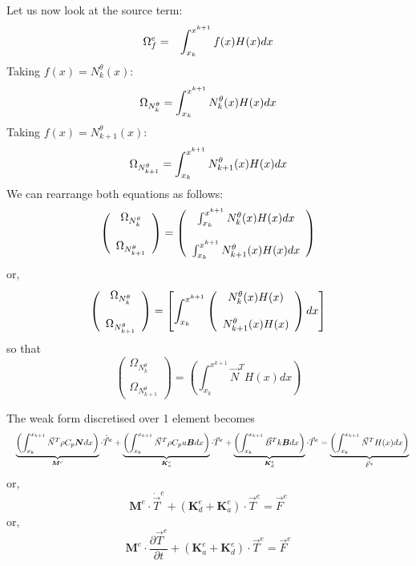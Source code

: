 Let us now look at the source term:
\begin{eqnarray}
{\Omega}_f^e &=&
\int_{x_k}^{x^{k+1}} f(x) H(x) dx \nonumber
\end{eqnarray}
Taking $f(x)=N_k^\theta(x)$: 
\[
{\Omega}_{N_k^\theta}=
\int_{x_k}^{x^{k+1}} N_k^\theta(x) H(x) dx \nonumber
\]
Taking $f(x)=N_{k+1}^\theta(x)$: 
\[
{\Omega}_{N_{k+1}^\theta}=
\int_{x_k}^{x^{k+1}} N_{k+1}^\theta(x) H(x) dx \nonumber
\]
We can rearrange both equations as follows:
\[
\left(
\begin{array}{cc}
 {\Omega}_{N_k^\theta} \\ \\ {\Omega}_{N_{k+1}^\theta}
\end{array}
\right)
=
\left(
\begin{array}{cc}
\int_{x_k}^{x^{k+1}} N_k^\theta(x) H(x) dx \nonumber \\ \\ 
\int_{x_k}^{x^{k+1}} N_{k+1}^\theta(x) H(x) dx \nonumber
\end{array}
\right)
\]
or,
\[
\left(
\begin{array}{cc}
 {\Omega}_{N_k^\theta} \\ \\ {\Omega}_{N_{k+1}^\theta}
\end{array}
\right)
=
\left[
\int_{x_k}^{x^{k+1}}
\left(
\begin{array}{cc}
N_k^\theta(x)  H(x)  \nonumber \\ \\ 
N_{k+1}^\theta(x) H(x)  \nonumber
\end{array}
\right)
dx
\right]
\]
so that 
\[
\left(
\begin{array}{cc}
 {\Omega}_{N_k^\theta} \\ \\ {\Omega}_{N_{k+1}^\theta}
\end{array}
\right)
=
\left(
\int_{x_k}^{x^{k+1}}
{\vec N}^T H(x) dx
\right)
\]

The weak form discretised over 1 element becomes
\begin{eqnarray}
&&\underbrace{\left( \int_{x_k}^{x_{k+1}}   {\vec N}^T \rho C_p {\bm N} dx  \right) }_{\bm M^e} \cdot \dot{\vec T}^e
+
\underbrace{\left( \int_{x_k}^{x_{k+1}}   {\vec N}^T \rho C_p u {\bm B} dx  \right)}_{{\bm K}_a^e} \cdot {\vec T}^e 
 +
\underbrace{\left( \int_{x_k}^{x_{k+1}}   {\vec B}^T k {\bm B} dx  \right)}_{{\bm K}_d^e} \cdot {\vec T}^e 
=
\underbrace{\left( \int_{x_k}^{x_{k+1}}   {\vec N}^T H(x) dx \right)}_{{\vec F}^e} \nonumber 
\end{eqnarray}
or,
\[
\boxed{
{\bm M}^e \cdot \dot{\vec T}^e + ({\bm K}_d^e + {\bm K}_a^e)\cdot {\vec T}^e = {\vec F}^e
}
\]
or,
\[
\boxed{
{\bm M}^e \cdot \frac{\partial {\vec T}^e}{\partial t} + ({\bm K}_a^e + {\bm K}_d^e) \cdot {\vec T}^e = {\vec F}^e
}
\]











